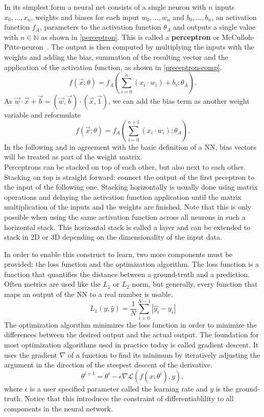 In its simplest form a neural net consists of a single neuron with $n$ inputs $x_0, \dots, x_n$, weights and biases for each input $w_0, \dots, w_n$ and $b_0, \dots, b_n$, an activation function $f_A$, parameters to the activation function $\theta_A$ and outputs a single value with $n \in \mathbb{N}$ as shown in \ref{perceptron}.
This is called a \textbf{perceptron} or McCulloh-Pitts-neuron~\autocite{rosenblatt_perceptron_1958, mcculloch_logical_1943}.
The output is then computed by multiplying the inputs with the weights and adding the bias, summation of the resulting vector and the application of the activation function, as shown in \ref{preceptron-comp}.
\[ f(\overrightarrow{x}; \theta) = f_A(\sum_{i = 0}^n (x_i \cdot w_i) + b_i; \theta_A). \]
As $\overrightarrow{w} \cdot \overrightarrow{x} + \overrightarrow{b} = (\overrightarrow{w}, \overrightarrow{b}) \cdot (\overrightarrow{x}, \overrightarrow{1})$, we can add the bias term as another weight variable and reformulate
\[ f(\overrightarrow{x}; \theta) = f_A(\sum_{i = 0}^{n + 1} (x_i \cdot w_i); \theta_A). \]
In the following and in agreement with the basic definition of a NN, bias vectors will be treated as part of the weight matrix. \\
Perceptrons can be stacked on top of each other, but also next to each other.
Stacking on top is straight forward: connect the output of the first peceptron to the input of the following one.
Stacking horizontally is usually done using matrix operations and delaying the activation function application until the matrix multiplication of the inputs and the weights are finished.
Note that this is only possible when using the same activation function across all neurons in such a horizontal stack.
This horizontal stack is called a layer and can be extended to stack in 2D or 3D depending on the dimensionality of the input data.

In order to enable this construct to learn, two more components must be provided: the loss function and the optimization algorithm.
The loss function is a function that quantifies the distance between a ground-truth and a prediction.
Often metrics are used like the $L_1$ or $L_2$ norm, but generally, every function that maps an output of the NN to a real number is usable.
\[ L_1 (y, \hat{y}) = \frac{1}{N} \sum_{i = 0}^{N-1} | \hat{y_i} - y_i | \]
The optimization algorithm minimizes the loss function in order to minimize the differences between the desired output and the actual output.
The foundation for most optimization algorithms used in practice today is called gradient descent.
It uses the gradient $\nabla$ of a function to find its minimum by iteratively adjusting the argument in the direction of the steepest descent of the derivative.
\[ \theta^{i+1} = \theta^i - \epsilon \nabla \mathcal{L}(f(x; \theta^i), y), \]
where $\epsilon$ is a user specified parameter called the learning rate and $y$ is the ground-truth.
Notice that this introduces the constraint of differentiablility to all components in the neural network. \\

